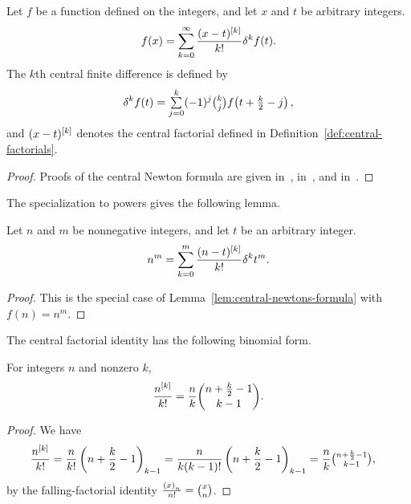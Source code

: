 \begin{lemma}
  Let $f$ be a function defined on the integers, and let $x$ and $t$ be arbitrary integers.
  \label{lem:central-newtons-formula}
  \begin{align*}
    f(x)
    = \sum_{k=0}^{\infty} \frac{(x-t)^{[k]}}{k!} \delta^{k} f(t).
  \end{align*}
  The $k$th central finite difference is defined by
  \begin{align*}
    \delta^{k} f(t) = \mathop{\textstyle\sum}_{j=0}^{k} (-1)^j \tbinom{k}{j} f\!\left(t+\tfrac{k}{2} - j\right),
  \end{align*}
  and $(x-t)^{[k]}$ denotes the central factorial defined in Definition~\eqref{def:central-factorials}.
  \begin{proof}
    Proofs of the central Newton formula are given in~\cite[p.~462]{butzer1989central}, in~\cite[Section 2, Equation (19)]{steffensen1927interpolation}, and in~\cite[Section 6, Equation (21)]{riordan1968combinatorial}.
  \end{proof}
\end{lemma}
The specialization to powers gives the following lemma.
\begin{lemma}
  \label{lem:central-newtons-formula-for-powers}
  Let $n$ and $m$ be nonnegative integers, and let $t$ be an arbitrary integer.
  \begin{align*}
    n^m = \sum_{k=0}^{m} \frac{(n-t)^{[k]}}{k!} \delta^{k} t^m.
  \end{align*}
  \begin{proof}
    This is the special case of Lemma~\eqref{lem:central-newtons-formula} with $f(n) = n^m$.
  \end{proof}
\end{lemma}
The central factorial identity has the following binomial form.
\begin{lemma}
  \label{lem:central-factorials-binomial-form}
  For integers $n$ and nonzero $k$,
  \begin{align*}
    \frac{n^{[k]}}{k!}
    = \frac{n}{k} \binom{n+\frac{k}{2}-1}{k-1}.
  \end{align*}
  \begin{proof}
    We have
    \begin{align*}
      \frac{n^{[k]}}{k!}
      &= \frac{n}{k!}\left(n+\frac{k}{2}-1\right)_{k-1}
      = \frac{n}{k (k-1)!} \left(n+\frac{k}{2}-1\right)_{k-1}
      = \frac{n}{k} \tbinom{n+\frac{k}{2}-1}{k-1},
    \end{align*}
    by the falling-factorial identity
    $\frac{\left(x\right)_{n}}{n!} = \tbinom{x}{n}$.
  \end{proof}
\end{lemma}
